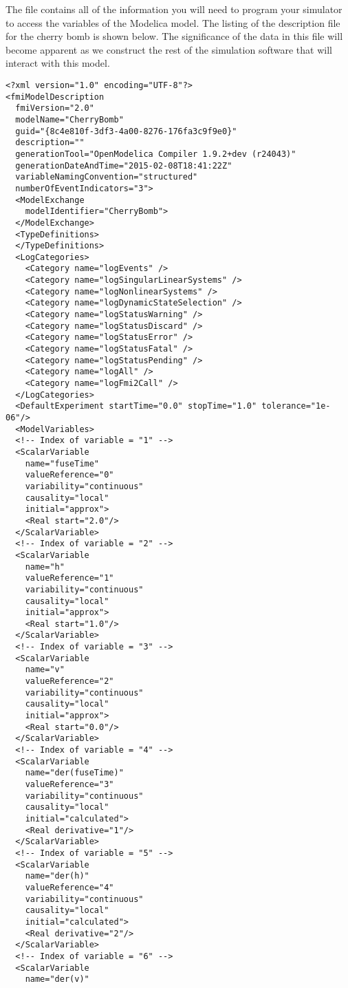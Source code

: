 The file  contains all of the information you will need to program your simulator to access the variables of the Modelica model. The listing of the description file for the cherry bomb is shown below. The significance of the data in this file will become apparent as we construct the rest of the simulation software that will interact with this model.
\begin{verbatim}
<?xml version="1.0" encoding="UTF-8"?>
<fmiModelDescription
  fmiVersion="2.0"
  modelName="CherryBomb"
  guid="{8c4e810f-3df3-4a00-8276-176fa3c9f9e0}"
  description=""
  generationTool="OpenModelica Compiler 1.9.2+dev (r24043)"
  generationDateAndTime="2015-02-08T18:41:22Z"
  variableNamingConvention="structured"
  numberOfEventIndicators="3">
  <ModelExchange
    modelIdentifier="CherryBomb">
  </ModelExchange>
  <TypeDefinitions>
  </TypeDefinitions>
  <LogCategories>
    <Category name="logEvents" />
    <Category name="logSingularLinearSystems" />
    <Category name="logNonlinearSystems" />
    <Category name="logDynamicStateSelection" />
    <Category name="logStatusWarning" />
    <Category name="logStatusDiscard" />
    <Category name="logStatusError" />
    <Category name="logStatusFatal" />
    <Category name="logStatusPending" />
    <Category name="logAll" />
    <Category name="logFmi2Call" />
  </LogCategories>
  <DefaultExperiment startTime="0.0" stopTime="1.0" tolerance="1e-06"/>
  <ModelVariables>
  <!-- Index of variable = "1" -->
  <ScalarVariable
    name="fuseTime"
    valueReference="0"
    variability="continuous"
    causality="local"
    initial="approx">
    <Real start="2.0"/>
  </ScalarVariable>
  <!-- Index of variable = "2" -->
  <ScalarVariable
    name="h"
    valueReference="1"
    variability="continuous"
    causality="local"
    initial="approx">
    <Real start="1.0"/>
  </ScalarVariable>
  <!-- Index of variable = "3" -->
  <ScalarVariable
    name="v"
    valueReference="2"
    variability="continuous"
    causality="local"
    initial="approx">
    <Real start="0.0"/>
  </ScalarVariable>
  <!-- Index of variable = "4" -->
  <ScalarVariable
    name="der(fuseTime)"
    valueReference="3"
    variability="continuous"
    causality="local"
    initial="calculated">
    <Real derivative="1"/>
  </ScalarVariable>
  <!-- Index of variable = "5" -->
  <ScalarVariable
    name="der(h)"
    valueReference="4"
    variability="continuous"
    causality="local"
    initial="calculated">
    <Real derivative="2"/>
  </ScalarVariable>
  <!-- Index of variable = "6" -->
  <ScalarVariable
    name="der(v)"

\end{verbatim}
